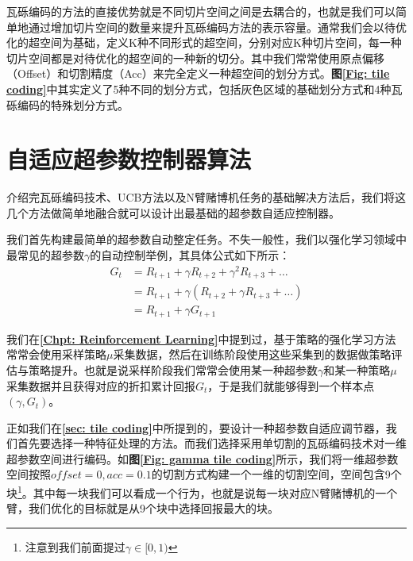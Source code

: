 瓦砾编码的方法的直接优势就是不同切片空间之间是去耦合的，也就是我们可以简单地通过增加切片空间的数量来提升瓦砾编码方法的表示容量。通常我们会以待优化的超空间为基础，定义K种不同形式的超空间，分别对应K种切片空间，每一种切片空间都是对待优化的超空间的一种新的切分。其中我们常常使用原点偏移（Offset）和切割精度（Acc）来完全定义一种超空间的划分方式。\textbf{图\ref{Fig: tile coding}}中其实定义了5种不同的划分方式，包括灰色区域的基础划分方式和4种瓦砾编码的特殊划分方式。

\section{自适应超参数控制器算法}
介绍完瓦砾编码技术、UCB方法以及N臂赌博机任务的基础解决方法后，我们将这几个方法做简单地融合就可以设计出最基础的超参数自适应控制器。

我们首先构建最简单的超参数自动整定任务。不失一般性，我们以强化学习领域中最常见的超参数$\gamma$的自动控制举例，其具体公式如下所示：
\begin{equation}
\begin{aligned}
G_{t} &=R_{t+1}+\gamma R_{t+2}+\gamma^{2} R_{t+3}+\ldots \\
&=R_{t+1}+\gamma\left(R_{t+2}+\gamma R_{t+3}+\ldots\right) \\
&=R_{t+1}+\gamma G_{t+1}
\end{aligned}
\end{equation}

我们在\textbf{\ref{Chpt: Reinforcement Learning}}中提到过，基于策略的强化学习方法常常会使用采样策略$\mu$采集数据，然后在训练阶段使用这些采集到的数据做策略评估与策略提升。也就是说采样阶段我们常常会使用某一种超参数$\gamma$和某一种策略$\mu$采集数据并且获得对应的折扣累计回报$G_t$，于是我们就能够得到一个样本点$(\gamma,G_t)$。

正如我们在\textbf{\ref{sec: tile coding}}中所提到的，要设计一种超参数自适应调节器，我们首先要选择一种特征处理的方法。而我们选择采用单切割的瓦砾编码技术对一维超参数空间进行编码。如\textbf{图\ref{Fig: gamma tile coding}}所示，我们将一维超参数空间按照$offset=0,acc=0.1$的切割方式构建一个一维的切割空间，空间包含9个块\footnote{注意到我们前面提过$\gamma\in[0,1)$}。其中每一块我们可以看成一个行为，也就是说每一块对应N臂赌博机的一个臂，我们优化的目标就是从9个块中选择回报最大的块。

